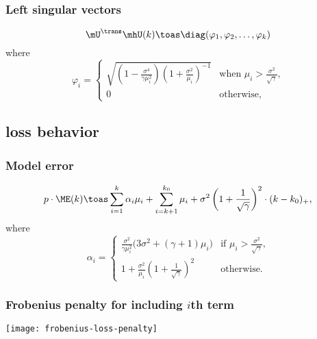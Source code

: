 \documentclass[14pt]{beamer}
\begin{document}
\begin{frame} 
  \frametitle{Left singular vectors}
  \begin{theorem}
    \[
      \mU^\trans \mhU(k)
      \toas
      \diag(\varphi_1, \varphi_2, \ldots, \varphi_k)
    \]
    where
    \[
      \varphi_i =
        \begin{cases}
            \sqrt{
                \left( 1 - \frac{\sigma^4}{ \gamma \mu_i^2} \right)
                \left( 1 + \frac{\sigma^2}{ \mu_i  } \right)^{-1} }
            &\text{when $\mu_i > \frac{\sigma^2}{\sqrt{\gamma}}$,} \\
            0
            &\text{otherwise,}
        \end{cases}
    \]
  \end{theorem}
\end{frame}

\subsection{loss behavior}

\begin{frame}
  \frametitle{Model error}
  \begin{theorem}
\begin{equation*}
    p \cdot {\ME} (k)
        \toas
        \sum_{i=1}^{k}
            \alpha_i \mu_i
        +
        \sum_{i=k+1}^{k_0}
            \mu_i
        +
        \sigma^2
        \left(
            1 + \frac{1}{\sqrt{\gamma}}
        \right)^2
        \cdot
        (k - k_0)_+,
\end{equation*}
where
\begin{equation*}
    \alpha_i 
    =
    \begin{cases}
        \frac{\sigma^2}{\gamma \mu_i^2}
                \big(
                    3 \sigma^2 + (\gamma+1) \mu_i
                \big)
            &\text{if $\mu_i > \frac{\sigma^2}{\sqrt{\gamma}}$,} \\
        1 
        + 
        \frac{\sigma^2}{\mu_i}
        \left(
            1
            +
            \frac{1}{\sqrt{\gamma}}
        \right)^2
            &\text{otherwise.}
    \end{cases}
\end{equation*}
\end{theorem}
\end{frame}

\begin{frame}
  \frametitle{Frobenius penalty for including $i$th term}
  \begin{center}
  \texttt{[image: frobenius-loss-penalty]}
  \end{center}
\end{frame}
\end{document}
